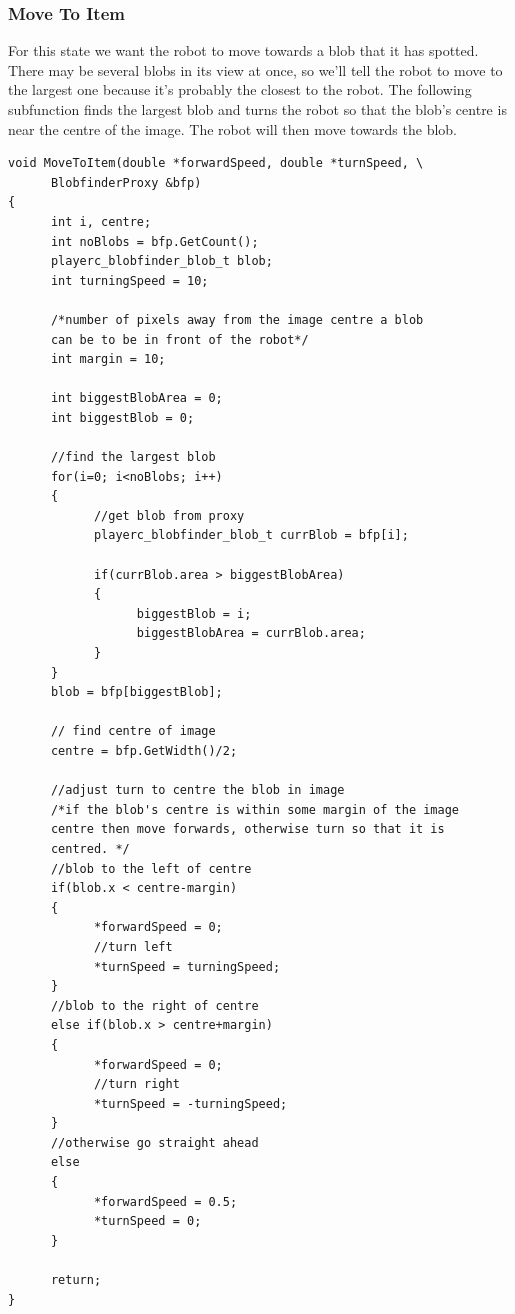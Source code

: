 \documentclass[a4paper]{article}
\begin{document}
\subsubsection{Move To Item}
For this state we want the robot to move towards a blob that it has spotted. There may be several blobs in its view at once, so we'll tell the robot to move to the largest one because it's probably the closest to the robot. The following subfunction finds the largest blob and turns the robot so that the blob's centre is near the centre of the image. The robot will then move towards the blob.
\begin{verbatim}
void MoveToItem(double *forwardSpeed, double *turnSpeed, \
      BlobfinderProxy &bfp)
{
      int i, centre;
      int noBlobs = bfp.GetCount();
      playerc_blobfinder_blob_t blob;
      int turningSpeed = 10;
      
      /*number of pixels away from the image centre a blob
      can be to be in front of the robot*/
      int margin = 10;
      
      int biggestBlobArea = 0;
      int biggestBlob = 0;
      
      //find the largest blob
      for(i=0; i<noBlobs; i++)
      {
            //get blob from proxy
            playerc_blobfinder_blob_t currBlob = bfp[i];
            
            if(currBlob.area > biggestBlobArea)
            {
                  biggestBlob = i;
                  biggestBlobArea = currBlob.area;
            }
      }
      blob = bfp[biggestBlob];
            
      // find centre of image
      centre = bfp.GetWidth()/2;
      
      //adjust turn to centre the blob in image
      /*if the blob's centre is within some margin of the image 
      centre then move forwards, otherwise turn so that it is 
      centred. */
      //blob to the left of centre
      if(blob.x < centre-margin)
      {
            *forwardSpeed = 0;
            //turn left
            *turnSpeed = turningSpeed;
      }
      //blob to the right of centre
      else if(blob.x > centre+margin)
      {
            *forwardSpeed = 0;
            //turn right
            *turnSpeed = -turningSpeed;
      }
      //otherwise go straight ahead
      else
      {
            *forwardSpeed = 0.5;
            *turnSpeed = 0;      
      }
      
      return;
}
\end{verbatim}
\end{document}
